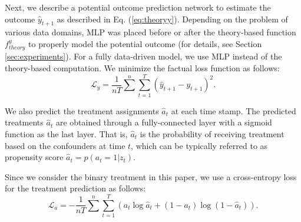 \documentclass[journal]{IEEEtran}
\begin{document}
Next, we describe a potential outcome prediction network to estimate the outcome $\hat{y}_{t+1}$ as described in Eq. (\ref{eq:theoryy}).
Depending on the problem of various data domains, MLP was placed before or after the theory-based function $f^y_{theory}$ to properly model the potential outcome (for details, see Section \ref{sec:experiments}).
For a fully data-driven model, we use MLP instead of the theory-based computation.
We minimize the factual loss function as follows:
\begin{equation}
\label{eq:outcome_loss}
    \mathcal{L}_y=\frac{1}{nT}\sum^{n}\sum_{t=1}^{T}(\hat{y}_{t+1}-y_{t+1})^{2}.
\end{equation}

We also predict the treatment assignments $\hat{a}_t$ at each time stamp. The predicted treatments $\hat{a}_t$ are obtained through a fully-connected layer with a sigmoid function as the last layer.
That is, $\hat{a}_t$ is the probability of receiving treatment based on the confounders at time $t$, which can be typically referred to as propensity score \cite{rosenbaum1983central} $\hat{a}_t=p(a_{t}=1|z_{t})$.

Since we consider the binary treatment in this paper, we use a cross-entropy loss for the treatment prediction as follows:
\begin{equation}
\label{eq:treatment-pred-loss}
    \mathcal{L}_a=-\frac{1}{nT}\sum^{n}\sum_{t=1}^{T}(a_t\log{\hat{a}_t}+(1-a_t)\log{(1-\hat{a}_t)}).
\end{equation}
\end{document}
